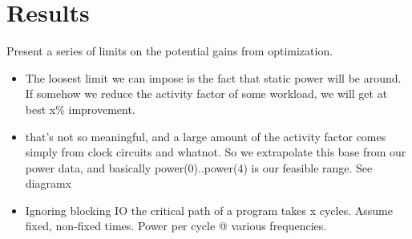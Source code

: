 \section{Results}
\label{sec:results}
Present a series of limits on the potential gains from optimization.

\begin{itemize}
	\item The loosest limit we can impose is the fact that static power will be around. If somehow we reduce the activity factor of some workload, we will get at best x\% improvement.
	\item that's not so meaningful, and a large amount of the activity factor comes simply from clock circuits and whatnot. So we extrapolate this base from our power data, and basically power(0)..power(4) is our feasible range. See diagramx
	\item Ignoring blocking IO the critical path of a program takes x cycles. Assume fixed, non-fixed times. Power per cycle @ various frequencies.
\end{itemize}

